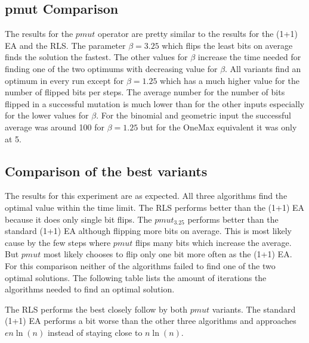 \subsection{pmut Comparison}



The results for the $pmut$ operator are pretty similar to the results for the (1+1) EA and the RLS.
The parameter $\beta=3.25$ which flips the least bits on average finds the solution the fastest.
The other values for $\beta$ increase the time needed for finding one of the two optimums with decreasing value for $\beta$.
All variants find an optimum in every run except for $\beta=1.25$ which has a much higher value for the number of flipped bits per steps.
The average number for the number of bits flipped in a successful mutation is much lower than for the other inputs especially for the lower values for $\beta$.
For the binomial and geometric input the successful average was around 100 for $\beta=1.25$ but for the OneMax equivalent it was only at 5.

\subsection{Comparison of the best variants}



The results for this experiment are as expected.
All three algorithms find the optimal value within the time limit.
The RLS performs better than the (1+1) EA because it does only single bit flips.
The $pmut_{3.25}$ performs better than the standard (1+1) EA although flipping more bits on average.
This is most likely cause by the few steps where $pmut$ flips many bits which increase the average.
But $pmut$ most likely chooses to flip only one bit more often as the (1+1) EA.\newline
For this comparison neither of the algorithms failed to find one of the two optimal solutions.
The following table lists the amount of iterations the algorithms needed to find an optimal solution.



The RLS performs the best closely follow by both $pmut$ variants.
The standard (1+1) EA performs a bit worse than the other three algorithms and approaches $en\ln(n)$ instead of staying close to $n\ln(n)$.

